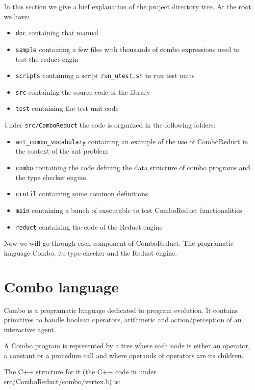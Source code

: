 \documentclass{article}
\begin{document}
  In this section we give a bief explanation of the project directory tree.
  At the root we have:
  \begin{itemize}
  \item \verb|doc| containing that manual
  \item \verb|sample| containing a few files with thousands of combo
    expressions used to test the reduct engin
  \item \verb|scripts| containing a script \verb|run_utest.sh| 
    to run test units
  \item \verb|src| containing the source code of the library
  \item \verb|test| containing the test unit code
  \end{itemize}
  
  Under \verb|src/ComboReduct| the code is organized in the following
  folders:
  \begin{itemize}
  \item \verb|ant_combo_vocabulary| containing an example of the use of
    ComboReduct in the context of the ant problem
  \item \verb|combo| containing the code defining the data structure
    of combo programs and the type checker engine.
  \item \verb|crutil| containing some common definitions
  \item \verb|main| containing a bunch of executable to test ComboReduct
    functionalities
  \item \verb|reduct| containing the code of the Reduct engine
  \end{itemize}

  Now we will go through each component of ComboReduct. The programatic language Combo, its type checker and the Reduct engine.
    
  \section{Combo language}
  
  Combo is a programatic language dedicated to program evolution.
  It contains primitives to handle boolean operators, arithmetic and
  action/perception of an interactive agent.
  
  A Combo program is represented by a tree where each node is either an
  operator, a constant or a procedure call and where operands of operators are
  its children.

  The C++ structure for it (the C++ code in under src/ComboReduct/combo/vertex.h)
  is:
\end{document}
